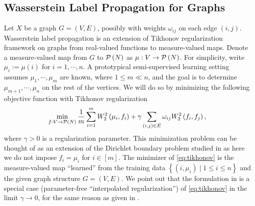 \documentclass[letterpaper]{article} %
\begin{document}
\subsection{Wasserstein Label Propagation for Graphs}
Let $X$ be a graph $G= \left( V,E \right)$, possibly with weights $\omega_{ij}$ on each edge $\left(i,j\right)$. Wasserstein label propagation is an extension of Tikhonov regularization framework on graphs \cite{Belkin2004} from real-valued functions to measure-valued maps. 
Denote a measure-valued map from $G$ to $\P\left( N \right)$ as $\mu:V\rightarrow\P\left( N \right)$. For simplicity, write $\mu_i:=\mu \left( i \right)$ for $i=1,\cdots,n$. A prototypical semi-supervised learning setting assumes $\mu_1,\cdots,\mu_m$ are known, where $1\leq m \ll n$, and the goal is to determine $\mu_{m+1},\cdots,\mu_n$ on the rest of the vertices. We will do so by minimizing the following objective function with Tikhonov regularization
\begin{equation}
  \label{eq:tikhonov}
  \min_{f:V\rightarrow \P\left( N \right)}\frac{1}{m}\sum_{i=1}^m W^2_2 \left( \mu_i,f_i \right)+\gamma\sum_{\left( i,j \right)\in E}\omega_{ij}W^2_2 \left( f_i,f_j \right),
\end{equation}
where $\gamma>0$ is a regularization parameter. This minimization problem can be thought of as an extension of the Dirichlet boundary problem studied in \cite{Solomon:2014} as here we do not impose $f_i=\mu_i$ for $i\in [m]$.
The minimizer of \eqref{eq:tikhonov} is the measure-valued map ``learned'' from the training data $\left\{ \left( i,\mu_i \right)\mid 1\leq i\leq n \right\}$ and the given graph structure $G= \left( V,E \right)$. We point out that the formulation in \cite{Solomon:2014} is a special case (parameter-free ``interpolated regularization'') of \eqref{eq:tikhonov} in the limit $\gamma\rightarrow0$, for the same reason as given in \cite[]{Belkin2004}.
 
\end{document}
